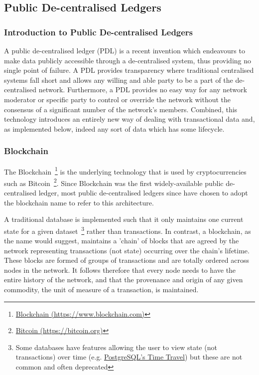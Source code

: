 \subsection{Public De-centralised Ledgers}

\subsubsection{Introduction to Public De-centralised Ledgers}

A public de-centralised ledger (PDL) is a recent invention which endeavours to make data publicly accessible through a de-centralised system, thus providing no single point of failure. A PDL provides transparency where traditional centralised systems fall short and allows any willing and able party to be a part of the de-centralised network. Furthermore, a PDL provides no easy way for any network moderator or specific party to control or override the network without the consensus of a significant number of the network's members. Combined, this technology introduces an entirely new way of dealing with transactional data and, as implemented below, indeed any sort of data which has some lifecycle.

\subsubsection{Blockchain}

The Blockchain~\footnote{\href{https://www.blockchain.com/}{Blockchain (https://www.blockchain.com)}} is the underlying technology that is used by cryptocurrencies such as Bitcoin~\footnote{\href{https://bitcoin.org/en/}{Bitcoin (https://bitcoin.org)}}. Since Blockchain was the first widely-available public de-centralised ledger, most public de-centralised ledgers since have chosen to adopt the blockchain name to refer to this architecture.

A traditional database is implemented such that it only maintains one current state for a given dataset~\footnote{Some databases have features allowing the user to view state (not transactions) over time (e.g. \href{https://www.postgresql.org/docs/6.3/static/c0503.htm}{PostgreSQL's Time Travel}) but these are not common and often deprecated} rather than transactions. In contrast, a blockchain, as the name would suggest, maintains a 'chain' of blocks that are agreed by the network representing transactions (not state) occurring over the chain's lifetime. These blocks are formed of groups of transactions and are totally ordered across nodes in the network. It follows therefore that every node needs to have the entire history of the network, and that the provenance and origin of any given commodity, the unit of measure of a transaction, is maintained.

